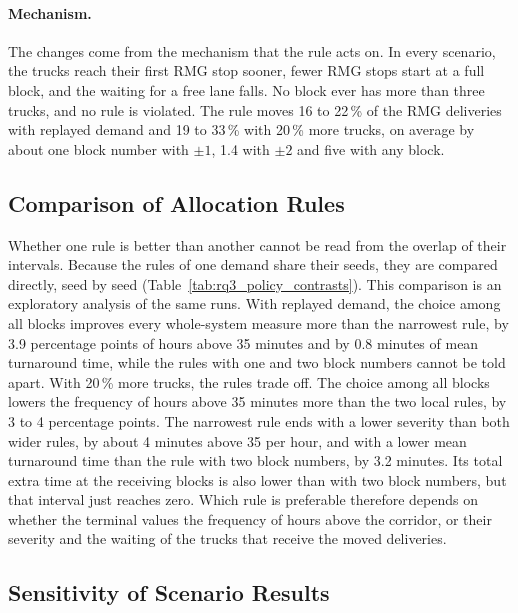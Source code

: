 \paragraph{Mechanism.} The changes come from the mechanism that the rule acts on. In
every scenario, the trucks reach their first RMG stop sooner, fewer RMG stops start
at a full block, and the waiting for a free lane falls. No block ever has more than
three trucks, and no rule is violated. The rule moves 16 to 22\,\% of the RMG
deliveries with replayed demand and 19 to 33\,\% with 20\,\% more trucks, on average by
about one block number with $\pm 1$, 1.4 with $\pm 2$ and five with any block.

\subsection{Comparison of Allocation Rules}
\label{sec:res_s1_contrasts}



Whether one rule is better than another cannot be read from the overlap of their
intervals. Because the rules of one demand share their seeds, they are compared
directly, seed by seed (Table~\ref{tab:rq3_policy_contrasts}). This comparison is an
exploratory analysis of the same runs. With replayed demand, the choice among all
blocks improves every whole-system measure more than the narrowest rule, by 3.9
percentage points of hours above 35 minutes and by 0.8 minutes of mean turnaround
time, while the rules with one and two block numbers cannot be told apart. With
20\,\% more trucks, the rules trade off. The choice among all blocks lowers the
frequency of hours above 35 minutes more than the two local rules, by 3 to 4
percentage points. The narrowest rule ends with a lower severity than both wider
rules, by about 4 minutes above 35 per hour, and with a lower mean turnaround time
than the rule with two block numbers, by 3.2 minutes. Its total extra time at the
receiving blocks is also lower than with two block numbers, but that interval just
reaches zero. Which rule is preferable therefore depends on whether the terminal
values the frequency of hours above the corridor, or their severity and the waiting
of the trucks that receive the moved deliveries.

\subsection{Sensitivity of Scenario Results}
\label{sec:res_s1_sensitivity}

